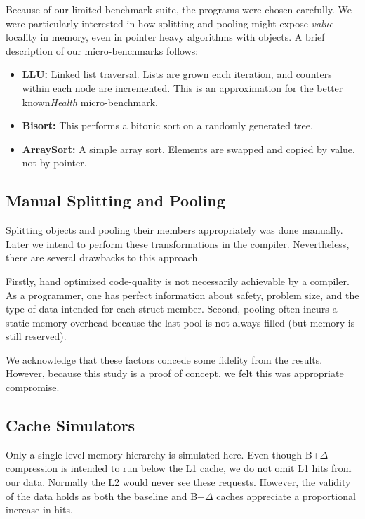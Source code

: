 \documentclass[pageno]{jpaper}
\begin{document}
Because of our limited benchmark suite, the programs were chosen carefully. We were particularly interested in how splitting and pooling might expose \textit{value}-locality in memory, even in pointer heavy algorithms with objects. A brief description of our micro-benchmarks follows:

\begin{itemize}
\item{\textbf{LLU:} Linked list traversal. Lists are grown each iteration, and counters within each node are incremented. This is an approximation for the better known\textit{Health} micro-benchmark.}
\item{\textbf{Bisort:} This performs a bitonic sort on a randomly generated tree.}
\item{\textbf{ArraySort:} A simple array sort. Elements are swapped and copied by value, not by pointer.}
\end{itemize}


\subsection{Manual Splitting and Pooling}
Splitting objects and pooling their members appropriately was done manually. Later we intend to perform these transformations in the compiler. Nevertheless, there are several drawbacks to this approach.

Firstly, hand optimized code-quality is not necessarily achievable by a compiler. As a programmer, one has perfect information about safety, problem size, and the type of data intended for each struct member. Second, pooling often incurs a static memory overhead\cite{mpads}  because the last pool is not always filled (but memory is still reserved).

We acknowledge that these factors concede some fidelity from the results. However, because this study is a proof of concept, we felt this was appropriate compromise.


\subsection{Cache Simulators}
Only a single level memory hierarchy is simulated here. Even though B+$\Delta$ compression is intended to run below the L1 cache, we do not omit L1 hits from our data. Normally the L2 would never see these requests. However, the validity of the data holds as both the baseline and B+$\Delta$ caches appreciate a proportional increase in hits.
\end{document}
